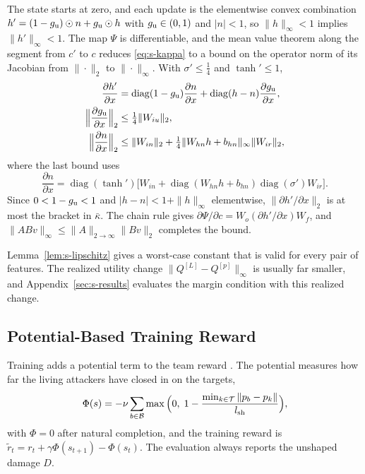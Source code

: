 \begin{IEEEproof}
The state starts at zero, and each update is the elementwise convex combination $h'=(1-g_{\rm u})\odot n+g_{\rm u}\odot h$ with $g_{\rm u}\in(0,1)$ and $|n|<1$, so $\|h\|_\infty<1$ implies $\|h'\|_\infty<1$. The map $\Psi$ is differentiable, and the mean value theorem along the segment from $c'$ to $c$ reduces \eqref{eq:s-kappa} to a bound on the operator norm of its Jacobian from $\|\cdot\|_2$ to $\|\cdot\|_\infty$. With $\sigma'\le\tfrac14$ and $\tanh'\le1$,
\begin{align*}
\frac{\partial h'}{\partial x}&=\operatorname{diag}(1-g_{\rm u})\frac{\partial n}{\partial x}+\operatorname{diag}(h-n)\frac{\partial g_{\rm u}}{\partial x},\\
\Big\|\frac{\partial g_{\rm u}}{\partial x}\Big\|_2&\le\tfrac14\|W_{iu}\|_2,\\
\Big\|\frac{\partial n}{\partial x}\Big\|_2&\le\|W_{in}\|_2+\tfrac14\|W_{hn}h+b_{hn}\|_\infty\|W_{ir}\|_2,
\end{align*}
where the last bound uses
\begin{equation*}
\frac{\partial n}{\partial x}=\operatorname{diag}(\tanh')\big[W_{in}+\operatorname{diag}(W_{hn}h+b_{hn})\operatorname{diag}(\sigma')W_{ir}\big].
\end{equation*}
Since $0<1-g_{\rm u}<1$ and $|h-n|<1+\|h\|_\infty$ elementwise, $\|\partial h'/\partial x\|_2$ is at most the bracket in $\bar\kappa$. The chain rule gives $\partial\Psi/\partial c=W_o(\partial h'/\partial x)W_f$, and $\|ABv\|_\infty\le\|A\|_{2\to\infty}\|Bv\|_2$ completes the bound.
\end{IEEEproof}

Lemma~\ref{lem:s-lipschitz} gives a worst-case constant that is valid for every pair of features. The realized utility change $\|Q^{[L]}-Q^{[p]}\|_\infty$ is usually far smaller, and Appendix~\ref{sec:s-results} evaluates the margin condition with this realized change.

\subsection{Potential-Based Training Reward}
Training adds a potential term to the team reward . The potential measures how far the living attackers have closed in on the targets,
\begin{equation}
\Phi(s)=-\nu\sum_{b\in\mathcal B}\max\Big(0,\;1-\frac{\min_{k\in\mathcal T}\|p_b-p_k\|}{l_{\rm sh}}\Big),
\label{eq:s-potential}
\end{equation}
with $\Phi=0$ after natural completion, and the training reward is $\tilde r_t=r_t+\gamma\Phi(s_{t+1})-\Phi(s_t)$. The evaluation always reports the unshaped damage $D$.

